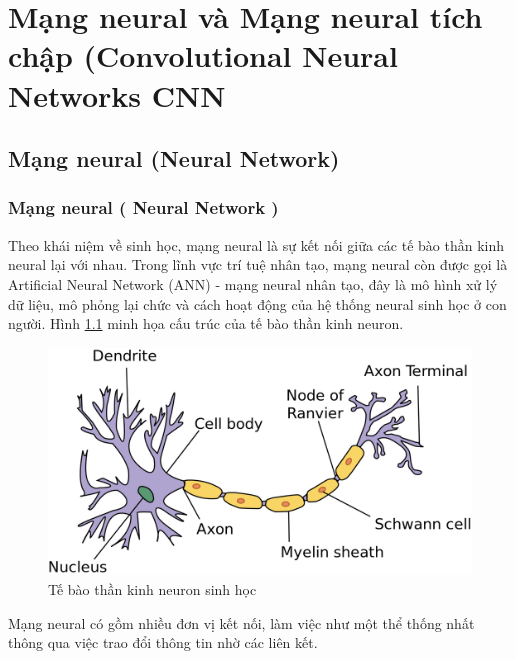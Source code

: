 \chapter{Mạng neural và Mạng neural tích chập (Convolutional Neural Networks CNN}

\section{Mạng neural (Neural Network)}

\subsection{Mạng neural ( Neural Network )}
	
	
	Theo khái niệm về sinh học, mạng neural là sự kết nối giữa các tế bào thần kinh neural lại với nhau. Trong lĩnh vực trí tuệ nhân tạo, mạng neural còn được gọi là Artificial Neural Network (ANN) - mạng neural nhân tạo, đây là mô hình xử lý dữ liệu, mô phỏng lại chức và cách hoạt động của hệ thống neural sinh học ở con người. Hình \ref{fig:neuron} minh họa cấu trúc của tế bào thần kinh neuron.
	
	\begin{figure}[h!]
		\centering
		\includegraphics[scale=0.18]{charts/neuron.png}
		\caption{Tế bào thần kinh neuron sinh học}
		\label{fig:neuron}
	\end{figure}
	
	Mạng neural có gồm nhiều đơn vị kết nối, làm việc như một thể thống nhất thông qua việc trao đổi thông tin nhờ các liên kết.
	
